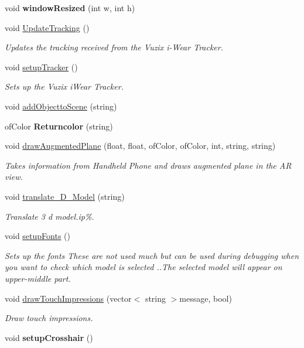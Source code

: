 \begin{DoxyCompactItemize}
\item 
\hypertarget{group___open_frame_works_ga428b7df9c64352d6e7cb234fc297e6c9}{void {\bfseries window\-Resized} (int w, int h)}\label{group___open_frame_works_ga428b7df9c64352d6e7cb234fc297e6c9}

\item 
void \hyperlink{classtest_app_a853bbabdab3e7d2f207bb5a2028990bd}{Update\-Tracking} ()
\begin{DoxyCompactList}\small\item\em Updates the tracking received from the Vuzix i-\/\-Wear Tracker. \end{DoxyCompactList}\item 
void \hyperlink{classtest_app_a6a4db7a6a914fc4899763fc94bfca4b7}{setup\-Tracker} ()
\begin{DoxyCompactList}\small\item\em Sets up the Vuzix i\-Wear Tracker. \end{DoxyCompactList}\item 
void \hyperlink{classtest_app_aa1d58aa9130d8d7526eb407f13f7a833}{add\-Objectto\-Scene} (string)
\item 
\hypertarget{classtest_app_a689f3b0cf0b38217152da7f5ce0d609f}{of\-Color {\bfseries Returncolor} (string)}\label{classtest_app_a689f3b0cf0b38217152da7f5ce0d609f}

\item 
void \hyperlink{classtest_app_a34646de458b0af33bc02457c9b8583df}{draw\-Augmented\-Plane} (float, float, of\-Color, of\-Color, int, string, string)
\begin{DoxyCompactList}\small\item\em Takes information from Handheld Phone and draws augmented plane in the A\-R view. \end{DoxyCompactList}\item 
void \hyperlink{classtest_app_ae9ee24f0c2bec5965519deef1a14da16}{translate\-\_\-D\-\_\-\-Model} (string)
\begin{DoxyCompactList}\small\item\em Translate 3 d model.ip\%. \end{DoxyCompactList}\item 
void \hyperlink{group___g_u_i_ga210397e42daad5b2ded2b80598905827}{setup\-Fonts} ()
\begin{DoxyCompactList}\small\item\em Sets up the fonts These are not used much but can be used during debugging when you want to check which model is selected ..The selected model will appear on upper-\/middle part. \end{DoxyCompactList}\item 
void \hyperlink{group___g_u_i_ga12fd724a9073e84f1367d01f97d222d8}{draw\-Touch\-Impressions} (vector$<$ string $>$message, bool)
\begin{DoxyCompactList}\small\item\em Draw touch impressions. \end{DoxyCompactList}\item 
\hypertarget{classtest_app_aae96728967b563fab5b52350915829b7}{void {\bfseries setup\-Crosshair} ()}\label{classtest_app_aae96728967b563fab5b52350915829b7}


\end{DoxyCompactItemize}
